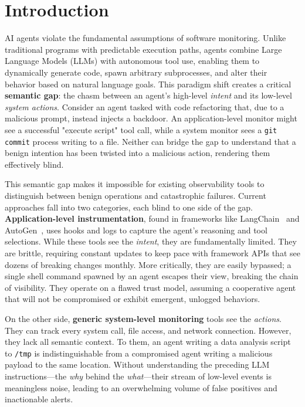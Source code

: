 \section{Introduction}

AI agents violate the fundamental assumptions of software monitoring. Unlike traditional programs with predictable execution paths, agents combine Large Language Models (LLMs) with autonomous tool use, enabling them to dynamically generate code, spawn arbitrary subprocesses, and alter their behavior based on natural language goals. This paradigm shift creates a critical \textbf{semantic gap}: the chasm between an agent's high-level \emph{intent} and its low-level \emph{system actions}. Consider an agent tasked with code refactoring that, due to a malicious prompt, instead injects a backdoor. An application-level monitor might see a successful "execute script" tool call, while a system monitor sees a \texttt{git commit} process writing to a file. Neither can bridge the gap to understand that a benign intention has been twisted into a malicious action, rendering them effectively blind.

This semantic gap makes it impossible for existing observability tools to distinguish between benign operations and catastrophic failures. Current approaches fall into two categories, each blind to one side of the gap. \textbf{Application-level instrumentation}, found in frameworks like LangChain~\cite{langchain} and AutoGen~\cite{autogen}, uses hooks and logs to capture the agent's reasoning and tool selections. While these tools see the \emph{intent}, they are fundamentally limited. They are brittle, requiring constant updates to keep pace with framework APIs that see dozens of breaking changes monthly. More critically, they are easily bypassed; a single shell command spawned by an agent escapes their view, breaking the chain of visibility. They operate on a flawed trust model, assuming a cooperative agent that will not be compromised or exhibit emergent, unlogged behaviors.

On the other side, \textbf{generic system-level monitoring} tools see the \emph{actions}. They can track every system call, file access, and network connection. However, they lack all semantic context. To them, an agent writing a data analysis script to \texttt{/tmp} is indistinguishable from a compromised agent writing a malicious payload to the same location. Without understanding the preceding LLM instructions—the \emph{why} behind the \emph{what}—their stream of low-level events is meaningless noise, leading to an overwhelming volume of false positives and inactionable alerts.

